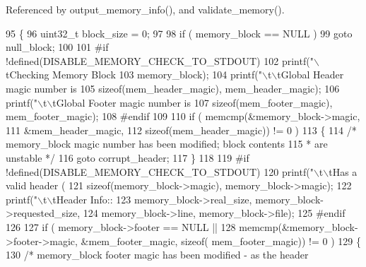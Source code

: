 Referenced by output\-\_\-memory\-\_\-info(), and validate\-\_\-memory().


\begin{DoxyCode}
95 \{
96         uint32\_t        block\_size = 0;
97 
98         \textcolor{keywordflow}{if} ( memory\_block == NULL )
99                 \textcolor{keywordflow}{goto} null\_block;
100 
101 \textcolor{preprocessor}{#if !defined(DISABLE\_MEMORY\_CHECK\_TO\_STDOUT)
}
102 \textcolor{preprocessor}{}        printf(\textcolor{stringliteral}{"\(\backslash\)tChecking Memory Block %
103                 memory\_block);
104         printf(\textcolor{stringliteral}{"\(\backslash\)t\(\backslash\)tGlobal Header magic number is %
105                 \textcolor{keyword}{sizeof}(mem_header_magic), mem_header_magic);
106         printf(\textcolor{stringliteral}{"\(\backslash\)t\(\backslash\)tGlobal Footer magic number is %
107                 \textcolor{keyword}{sizeof}(mem_footer_magic), mem_footer_magic);
108 \textcolor{preprocessor}{#endif
}
109 \textcolor{preprocessor}{}
110         \textcolor{keywordflow}{if} ( memcmp(&memory\_block->magic,
111                 &mem_header_magic,
112                 \textcolor{keyword}{sizeof}(mem_header_magic)) != 0 )
113         \{
114                 \textcolor{comment}{/* memory\_block magic number has been modified; block contents
}
115 \textcolor{comment}{                 * are unstable */}
116                 \textcolor{keywordflow}{goto} corrupt\_header;
117         \}
118 
119 \textcolor{preprocessor}{#if !defined(DISABLE\_MEMORY\_CHECK\_TO\_STDOUT)
}
120 \textcolor{preprocessor}{}        printf(\textcolor{stringliteral}{"\(\backslash\)t\(\backslash\)tHas a valid header (%
121                 \textcolor{keyword}{sizeof}(memory\_block->magic), memory\_block->magic);
122         printf(\textcolor{stringliteral}{"\(\backslash\)t\(\backslash\)tHeader Info:: %
123                 memory\_block->real_size, memory\_block->requested_size,
124                 memory\_block->line, memory\_block->file);
125 \textcolor{preprocessor}{#endif
}
126 \textcolor{preprocessor}{}
127         \textcolor{keywordflow}{if} ( memory\_block->footer == NULL ||
128                 memcmp(&memory\_block->footer->magic, &mem_footer_magic, \textcolor{keyword}{sizeof}(
      mem_footer_magic)) != 0 )
129         \{
130                 \textcolor{comment}{/* memory\_block footer magic has been modified - as the header
}}}}}}
\end{DoxyCode}
